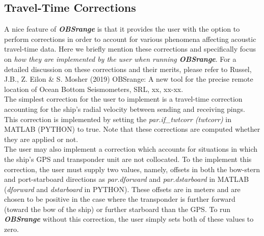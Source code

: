 \documentclass[titlepage, 12pt]{article}
\begin{document}
  \newpage
  
  \subsection{Travel-Time Corrections}
   \label{subsection:TTCs}

   A nice feature of \textbf{\textit{OBSrange}} is that it provides the user with the option to perform corrections in order to account for various phenomena affecting acoustic travel-time data. Here we briefly mention these corrections and specifically focus on \textit{how they are implemented by the user when running \textbf{OBSrange}}. For a detailed discussion on these corrections and their merits, please refer to Russel, J.B., Z. Eilon \& S. Mosher (2019) OBSrange: A new tool for the precise remote location of Ocean Bottom Seismometers, SRL, xx, xx-xx.\\

   The simplest correction for the user to implement is a travel-time correction accounting for the ship's radial velocity between sending and receiving pings. This correction is implemented by setting the \textit{par.if\_twtcorr (twtcorr)} in MATLAB (PYTHON) to true. Note that these corrections are computed whether they are applied or not.\\ 
   
   The user may also implement a correction which accounts for situations in which the ship's GPS and transponder unit are not collocated. To the implement this correction, the user must supply two values, namely, offsets in both the bow-stern and port-starboard directions as \textit{par.dforward} and \textit{par.dstarboard} in MATLAB (\textit{dforward} and \textit{dstarboard} in PYTHON). These offsets are in meters and are chosen to be positive in the case where the transponder is further forward (toward the bow of the ship) or further starboard than the GPS. To run \textbf{\textit{OBSrange}} without this correction, the user simply sets both of these values to zero.\\
\end{document}
